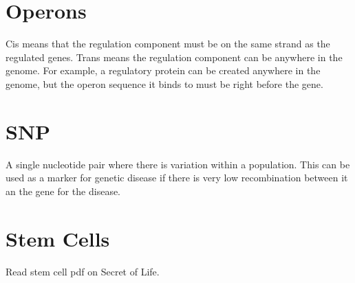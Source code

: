 \documentclass{article}
\begin{document}
\section{Operons}

Cis means that the regulation component must be on the same strand as the
regulated genes. Trans means the regulation component can be anywhere in the
genome. For example, a regulatory protein can be created anywhere in the genome,
but the operon sequence it binds to must be right before the gene.

\section{SNP}

A single nucleotide pair where there is variation within a population. This can
be used as a marker for genetic disease if there is very low recombination
between it an the gene for the disease. 

\section{Stem Cells}

Read stem cell pdf on Secret of Life.
\end{document}
